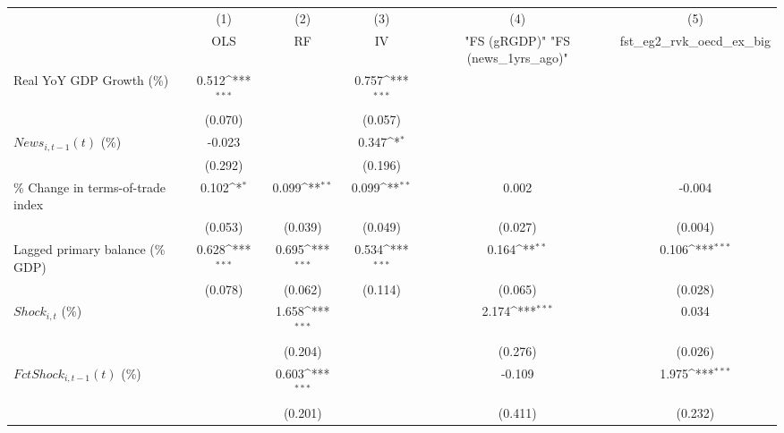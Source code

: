 {
\def\sym#1{\ifmmode^{#1}\else\(^{#1}\)\fi}
\begin{tabular}{l*{5}{c}}
\toprule
                    &\multicolumn{1}{c}{(1)}&\multicolumn{1}{c}{(2)}&\multicolumn{1}{c}{(3)}&\multicolumn{1}{c}{(4)}&\multicolumn{1}{c}{(5)}\\
                    &\multicolumn{1}{c}{OLS}&\multicolumn{1}{c}{RF}&\multicolumn{1}{c}{IV}&\multicolumn{1}{c}{ "FS (gRGDP)"  "FS (news_1yrs_ago)" }&\multicolumn{1}{c}{fst_eg2_rvk_oecd_ex_big}\\
\midrule
Real YoY GDP Growth (\%)&       0.512\sym{***}&                     &       0.757\sym{***}&                     &                     \\
                    &     (0.070)         &                     &     (0.057)         &                     &                     \\
\addlinespace
$ News_{i,t-1}(t)$ (\%)&      -0.023         &                     &       0.347\sym{*}  &                     &                     \\
                    &     (0.292)         &                     &     (0.196)         &                     &                     \\
\addlinespace
\% Change in terms-of-trade index&       0.102\sym{*}  &       0.099\sym{**} &       0.099\sym{**} &       0.002         &      -0.004         \\
                    &     (0.053)         &     (0.039)         &     (0.049)         &     (0.027)         &     (0.004)         \\
\addlinespace
Lagged primary balance (\% GDP)&       0.628\sym{***}&       0.695\sym{***}&       0.534\sym{***}&       0.164\sym{**} &       0.106\sym{***}\\
                    &     (0.078)         &     (0.062)         &     (0.114)         &     (0.065)         &     (0.028)         \\
\addlinespace
$ Shock_{i,t}$ (\%) &                     &       1.658\sym{***}&                     &       2.174\sym{***}&       0.034         \\
                    &                     &     (0.204)         &                     &     (0.276)         &     (0.026)         \\
\addlinespace
$ FctShock_{i,t-1}(t)$ (\%)&                     &       0.603\sym{***}&                     &      -0.109         &       1.975\sym{***}\\
                    &                     &     (0.201)         &                     &     (0.411)         &     (0.232)         \\

\end{tabular}}
